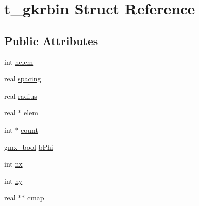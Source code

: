 \hypertarget{structt__gkrbin}{\section{t\-\_\-gkrbin \-Struct \-Reference}
\label{structt__gkrbin}
}
\subsection*{\-Public \-Attributes}
\begin{DoxyCompactItemize}
\item 
int \hyperlink{structt__gkrbin_a79f2a28311188f9b51dde67cb8855958}{nelem}
\item 
real \hyperlink{structt__gkrbin_a8d537e0d1dc7513eb5bbe6f14cfb9506}{spacing}
\item 
real \hyperlink{structt__gkrbin_af039f5b19a458e980f0918087b1bddc4}{radius}
\item 
real $\ast$ \hyperlink{structt__gkrbin_a3d735c7a6c9afe43e3f1afc628f6982b}{elem}
\item 
int $\ast$ \hyperlink{structt__gkrbin_ae130dc73f651f71ef6fd19649e264c15}{count}
\item 
\hyperlink{include_2types_2simple_8h_a8fddad319f226e856400d190198d5151}{gmx\-\_\-bool} \hyperlink{structt__gkrbin_aa4e4b86e1ee41e79f33630cc89a25884}{b\-Phi}
\item 
int \hyperlink{structt__gkrbin_aedaf7c275ea9f1077581c09caf26872e}{nx}
\item 
int \hyperlink{structt__gkrbin_a7b5716fe947f4fd2f962065abc854425}{ny}
\item 
real $\ast$$\ast$ \hyperlink{structt__gkrbin_abf7c7137d345175593e9ea6ea3796de0}{cmap}
\end{DoxyCompactItemize}


